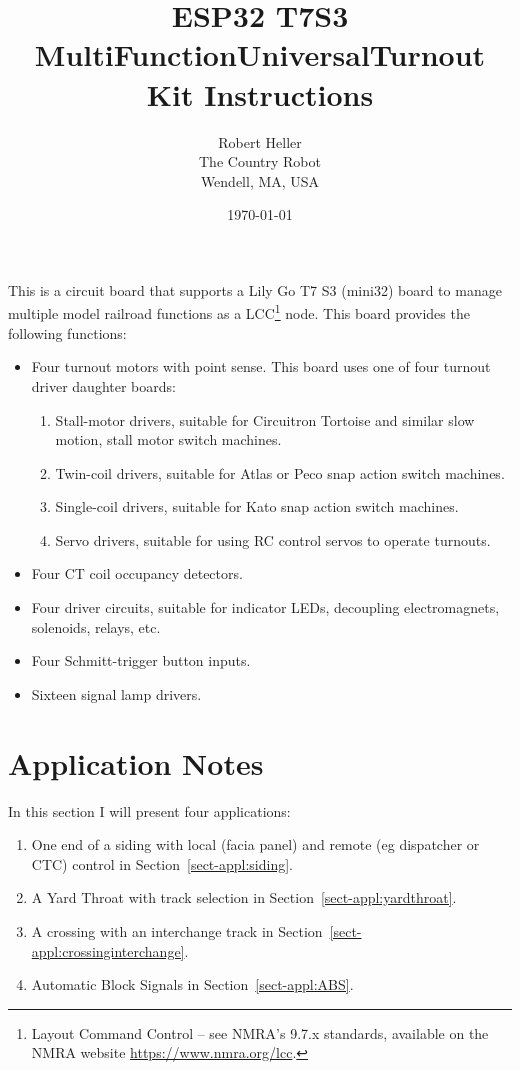 \documentclass[12pt,twoside,letterpaper]{article}
\title{ESP32 T7S3 MultiFunctionUniversalTurnout Kit Instructions}
\author{Robert Heller \\ The Country Robot \\ Wendell, MA, USA}
\date{\today}
\begin{document}
\maketitle

This is a circuit board that supports a Lily Go T7 S3 (mini32) board to manage
multiple model railroad functions as a LCC\footnote{Layout Command Control --
see NMRA's 9.7.x standards, available on the NMRA website
\url{https://www.nmra.org/lcc}.} node. This board provides the following 
functions:

\begin{itemize}
\item Four turnout motors with point sense.  This board uses one of four 
turnout driver daughter boards:
\begin{enumerate}
\item Stall-motor drivers, suitable for Circuitron Tortoise and similar slow 
motion, stall motor switch machines.
\item Twin-coil drivers, suitable for Atlas or Peco snap action switch 
machines.
\item Single-coil drivers, suitable for Kato snap action switch machines.
\item Servo drivers, suitable for using RC control servos to operate turnouts.
\end{enumerate}
\item Four CT coil occupancy detectors.
\item Four driver circuits, suitable for indicator LEDs, decoupling 
electromagnets, solenoids, relays, etc.
\item Four Schmitt-trigger button inputs.
\item Sixteen signal lamp drivers.
\end{itemize}

\clearpage



\section{Application Notes}

In this section I will present four applications:

\begin{enumerate}
\item One end of a siding with local (facia panel) and remote (eg dispatcher
or CTC) control in Section~\ref{sect-appl:siding}.
\item A Yard Throat with track selection in 
Section~\ref{sect-appl:yardthroat}. 
\item A crossing with an interchange track in 
Section~\ref{sect-appl:crossinginterchange}.
\item Automatic Block Signals in Section~\ref{sect-appl:ABS}.
\end{enumerate}





\end{document}
